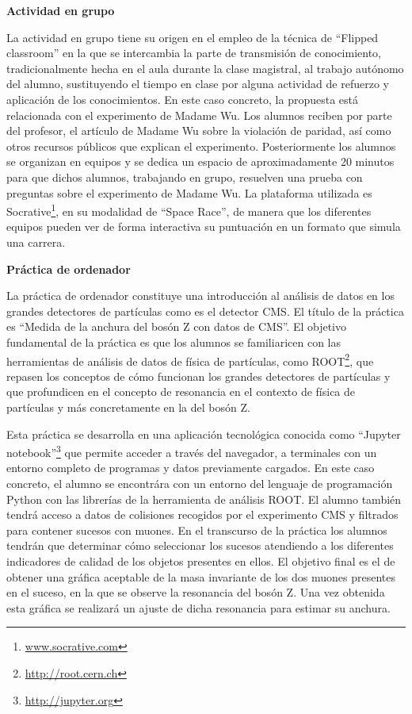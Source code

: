 \textbf{Actividad en grupo}

La actividad en grupo tiene su origen en el empleo de la técnica de ``Flipped classroom'' en la que se intercambia la parte de transmisión de conocimiento, tradicionalmente hecha en el aula durante la clase magistral, al trabajo autónomo del alumno, sustituyendo el tiempo en clase por alguna actividad de refuerzo y aplicación de los conocimientos. En este caso concreto, la propuesta está relacionada con el experimento de Madame Wu. Los alumnos reciben por parte del profesor, el artículo de Madame Wu sobre la violación de paridad, así como otros recursos públicos que explican el experimento. Posteriormente los alumnos se organizan en equipos y se dedica un espacio de aproximadamente 20 minutos para que dichos alumnos, trabajando en grupo, resuelven una prueba con preguntas sobre el experimento de Madame Wu. La plataforma utilizada es Socrative\footnote{\url{www.socrative.com}}, en su modalidad de ``Space Race'', de manera que los diferentes equipos pueden ver de forma interactiva su puntuación en un formato que simula una carrera. 

\textbf{Práctica de ordenador}

La práctica de ordenador constituye una introducción al análisis de datos en los grandes detectores de partículas como es el detector CMS. El título de la práctica es ``Medida de la anchura del bosón Z con datos de CMS''. El objetivo fundamental de la práctica es que los alumnos se familiaricen con las herramientas de análisis de datos de física de partículas, como ROOT\footnote{\url{http://root.cern.ch}}, que repasen los conceptos de cómo funcionan los grandes detectores de partículas y que profundicen en el concepto de resonancia en el contexto de física de partículas y más concretamente en la del bosón Z.

Esta práctica se desarrolla en una aplicación tecnológica conocida como ``Jupyter notebook''\footnote{\url{http://jupyter.org}} que permite acceder a través del navegador, a terminales con un entorno completo de programas y datos previamente cargados. En este caso concreto, el alumno se encontrára con un entorno del lenguaje de programación Python con las librerías de la herramienta de análisis ROOT. El alumno también tendrá acceso a datos de colisiones recogidos por el experimento CMS y filtrados para contener sucesos con muones. En el transcurso de la práctica los alumnos tendrán que determinar cómo seleccionar los sucesos atendiendo a los diferentes indicadores de calidad de los objetos presentes en ellos. El objetivo final es el de obtener una gráfica aceptable de la masa invariante de los dos muones presentes en el suceso, en la que se observe la resonancia del bosón Z. Una vez obtenida esta gráfica se realizará un ajuste de dicha resonancia para estimar su anchura.




